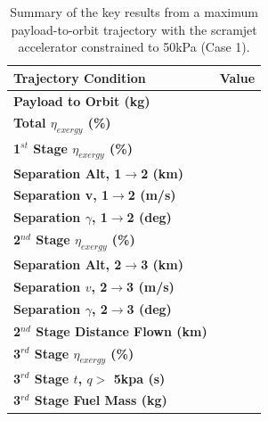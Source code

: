 \begin{table}[ht]%
	\centering
	
	\begin{tabular}{l c } 
		\hline \textbf{Trajectory Condition}
		&Value
		\\
		\hline \textbf{Payload to Orbit (kg)}
		& \textbf{\PayloadToOrbitConstqNoReturn}
		\\
		\textbf{Total $\eta_{exergy}$ (\%)}
		& \textbf{\totalExergyEffConstqNoReturn}
		\\
		\hline 
		\textbf{1$^{st}$ Stage $\eta_{exergy}$ (\%)}
		& \textbf{\firstExergyEffConstqNoReturn}
		\\
	
		\textbf{Separation Alt, 1$\rightarrow$2 (km)}
		& \firstsecondSeparationAltConstqNoReturn
		\\
		\textbf{Separation v, 1$\rightarrow$2 (m/s)}
		& \firstsecondSeparationvConstqNoReturn
		\\
		\textbf{Separation $\gamma$, 1$\rightarrow$2 (deg)}
		& \firstsecondSeparationgammaConstqNoReturn
		\\
		\hline 
		\textbf{2$^{nd}$ Stage $\eta_{exergy}$ (\%)}
		& \textbf{\secondExergyEffConstqNoReturn}
		\\
		\textbf{Separation Alt, 2$\rightarrow$3 (km)}
		& \secondthirdSeparationAltConstqNoReturn
		\\
		\textbf{Separation $v$, 2$\rightarrow$3 (m/s)}
		& \secondthirdSeparationvConstqNoReturn
		\\
		\textbf{Separation $\gamma$, 2$\rightarrow$3 (deg)}
		& \secondthirdSeparationgammaConstqNoReturn
		\\
		\textbf{2$^{nd}$ Stage Distance Flown (km)}
		& \SecondDistConstqNoReturn
		\\
		\hline 
		\textbf{3$^{rd}$ Stage $\eta_{exergy}$ (\%)}
		& \textbf{\thirddExergyEffConstqNoReturn}
		\\
	
		\textbf{3$^{rd}$ Stage $t$, $q >$ 5kpa (s)}
		& \thirdqOverFiveConstqNoReturn
		\\
		\textbf{3$^{rd}$ Stage Fuel Mass (kg)}
		& \thirdmFuelConstqNoReturn
		\\
		\hline 
	\end{tabular} 
	
	\caption{Summary of the key results from a maximum payload-to-orbit trajectory with the scramjet accelerator constrained to 50kPa (Case 1).}
	\label{tab:constqsummary} %
\end{table}

